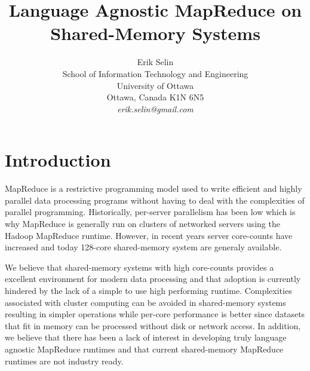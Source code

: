 \documentclass[twocolumn,11px]{article}       %
\begin{document}
\title{Language Agnostic MapReduce on Shared-Memory Systems}
\author{
Erik Selin\\
School of Information Technology and Engineering\\
University of Ottawa\\
Ottawa, Canada K1N 6N5 \\
{\em erik.selin@gmail.com}
} %


\section{Introduction} \label{intro}

MapReduce is a restrictive programming model used to write efficient and highly parallel data processing programs without having to deal with the complexities of parallel programming.
Historically, per-server parallelism has been low which is why MapReduce is generally run on clusters of networked servers using the Hadoop MapReduce runtime.
However, in recent years server core-counts have increased and today 128-core shared-memory system are generaly available.

We believe that shared-memory systems with high core-counts provides a excellent environment for modern data processing and that adoption is currently hindered by the lack of a simple to use high performing runtime.
Complexities associated with cluster computing can be avoided in shared-memory systems resulting in simpler operations while per-core performance is better since datasets that fit in memory can be processed without disk or network access.
In addition, we believe that there has been a lack of interest in developing truly language agnostic MapReduce runtimes and that current shared-memory MapReduce runtimes are not industry ready.
\end{document}
